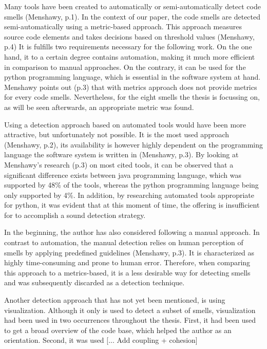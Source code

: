 Many tools have been created to automatically or semi-automatically detect code smells (Menshawy, p.1). In the context of our paper, the code smells are detected semi-automatically using a metric-based approach. This approach measures source code elements and takes decisions based on threshold values (Menshawy, p.4) It is fulfills two requirements necessary for the following work. On the one hand, it to a certain degree contains automation, making it much more efficient in comparison to manual approaches. On the contrary, it can be used for the python programming language, which is essential in the software system at hand. Menshawy points out (p.3) that with metrics approach does not provide metrics for every code smells. Nevertheless, for the eight smells the thesis is focussing on, as will be seen afterwards, an appropriate metric was found.

Using a detection approach based on automated tools would have been more attractive, but unfortunately not possible.  It is the most used approach (Menshawy, p.2), its availability is however highly dependent on the programming language the software system is written in (Menshawy, p.3). By looking at Menshawy's research (p.3) on most cited tools, it can be observed that a significant difference exists between java programming language, which was supported  by 48\% of the tools, whereas the python programming language being only supported by 4\%.
In addition, by researching automated tools appropriate for python, it was evident that at this moment of time, the offering is insufficient for to accomplish a sound detection strategy. 

In the beginning, the author has also considered following a manual approach. In contrast to automation, the manual detection relies on human perception of smells by applying predefined guidelines (Menshawy, p.3). It is characterized as highly time-consuming and prone to human error. Therefore, when comparing this approach to a metrics-based, it is a less desirable way for detecting smells and was subsequently discarded as a detection technique.

Another detection approach that has not yet been mentioned, is using visualization. Although it only is used to detect a subset of smells, visualization had been used in two occurrences throughout the thesis. First, it had been used to get a broad overview of the code base, which helped the author as an orientation. Second, it was used [... Add coupling + cohesion]

